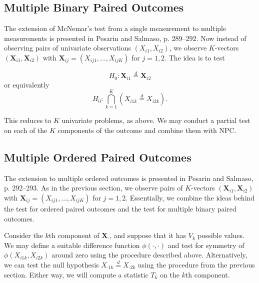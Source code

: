 \documentclass[12pt]{article}
\newcommand{\eqd}{\stackrel{d}{=}} %
\begin{document}
\subsection{Multiple Binary Paired Outcomes}
The extension of McNemar's test from a single measurement to multiple measurements is presented in Pesarin and Salmaso, p. 289--292.
Now instead of observing pairs of univariate observations $(X_{i1}, X_{i2})$, we observe $K$-vectors $(\mathbf{X}_{i1}, \mathbf{X}_{i2})$ with
$\mathbf{X}_{ij} = (X_{ij1}, \dots, X_{ijK})$ for $j=1,2$.
The idea is to test 

$$H_0: \mathbf{X}_{i1} \eqd \mathbf{X}_{i2}$$
or equivalently
$$H_0: \bigcap_{k=1}^K (X_{i1k} \eqd X_{i2k}).$$

This reduces to $K$ univariate problems, as above.
We may conduct a partial test on each of the $K$ components of the outcome and combine them with NPC.
\subsection{Multiple Ordered Paired Outcomes}
The extension to multiple ordered outcomes is presented in Pesarin and Salmaso, p. 292--293.  
As in the previous section, we observe pairs of $K$-vectors $(\mathbf{X}_{i1}, \mathbf{X}_{i2})$ with $\mathbf{X}_{ij} = (X_{ij1}, \dots, X_{ijK})$ for $j=1,2$.
Essentially, we combine the ideas behind the test for ordered paired outcomes and the test for multiple binary paired outcomes.

Consider the $k$th component of $\mathbf{X}_{\cdot}$, and suppose that it has $V_k$ possible values.
We may define a suitable difference function $\phi(\cdot, \cdot)$ and test for symmetry of $\phi(X_{i1k}, X_{i2k})$ around zero using the procedure described above.
Alternatively, we can test the null hypothesis $X_{\cdot 1 k} \eqd X_{\cdot 2k}$ using the procedure from the previous section.
Either way, we will compute a statistic $T_k$ on the $k$th component.
\end{document}
